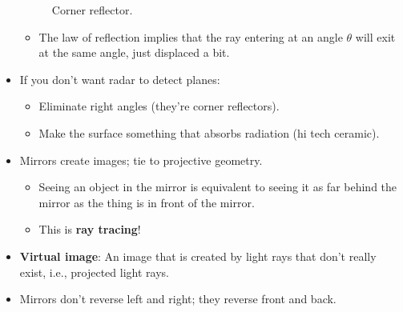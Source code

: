 \documentclass[../notes.tex]{subfiles}
\begin{document}
\begin{itemize}
\begin{figure}[h!]
        \caption{Corner reflector.}
        \label{fig:cornerReflector}
    \end{figure}
    \begin{itemize}
        \item The law of reflection implies that the ray entering at an angle $\theta$ will exit at the same angle, just displaced a bit.
    \end{itemize}
    \item If you don't want radar to detect planes:
    \begin{itemize}
        \item Eliminate right angles (they're corner reflectors).
        \item Make the surface something that absorbs radiation (hi tech ceramic).
    \end{itemize}
    \item Mirrors create images; tie to projective geometry.
    \begin{itemize}
        \item Seeing an object in the mirror is equivalent to seeing it as far behind the mirror as the thing is in front of the mirror.
        \item This is \textbf{ray tracing}!
    \end{itemize}
    \item \textbf{Virtual image}: An image that is created by light rays that don't really exist, i.e., projected light rays.
    \item Mirrors don't reverse left and right; they reverse front and back.
\end{itemize}
\end{document}
